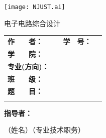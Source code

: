 \documentclass[twoside, openright]{article}
\begin{document}

\newcommand{\Title}{电子电路综合设计}

\begin{titlepage}
	\centering
	\begin{spacing}{1}
		\vspace{0.5\ccwd}

		\vspace{1\ccwd}

		\texttt{[image: NJUST.ai]}

		\vspace{0.2\ccwd}

		\fontsize{45pt}{45pt}\selectfont\heiti
		\Title

		\vspace{2\ccwd}
	\end{spacing}

	\begin{spacing}{1.5}
		\begin{tabu} to 12.59cm{@{}X[c, 3.2cm]@{}X[c, 4cm]@{}X[c, 2.22cm]@{}X[c, 3.89cm]@{}}
			\textbf{作　　者：} & \underline{} & \textbf{学　号：} & \underline{} \\
			\textbf{学　　院：} &  \\
			\textbf{专业(方向)：} &  \\
			\textbf{班　　级：} &  \\
			\textbf{题　　目：} &  \\
			\textbf{} & 
		\end{tabu}
		\vspace{0em}
	\end{spacing}

	\begin{spacing}{1}
		\vspace{3\ccwd}

		\textbf{指导者：}\underline{\makebox[15.5\ccwd][c]{}}

		\hspace{5em}（姓名）\hspace{11em}（专业技术职务）


\end{spacing}
\end{titlepage}
\end{document}

